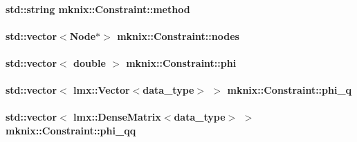\hypertarget{classmknix_1_1_constraint_ab05c0dcc5cc535f4e3bed2fd34ed6d75}{
\paragraph[{method}]{\setlength{\rightskip}{0pt plus 5cm}std\-::string mknix\-::\-Constraint\-::method\hspace{0.3cm}{\ttfamily [protected]}}}\label{classmknix_1_1_constraint_ab05c0dcc5cc535f4e3bed2fd34ed6d75}
\hypertarget{classmknix_1_1_constraint_aa4aa16e121963acf4c086f63137d4ac1}{
\paragraph[{nodes}]{\setlength{\rightskip}{0pt plus 5cm}std\-::vector$<${\bf Node}$\ast$$>$ mknix\-::\-Constraint\-::nodes\hspace{0.3cm}{\ttfamily [protected]}}}\label{classmknix_1_1_constraint_aa4aa16e121963acf4c086f63137d4ac1}
\hypertarget{classmknix_1_1_constraint_a10e027fc12cb248a49a1ded049f0a161}{
\paragraph[{phi}]{\setlength{\rightskip}{0pt plus 5cm}std\-::vector$<$ double $>$ mknix\-::\-Constraint\-::phi\hspace{0.3cm}{\ttfamily [protected]}}}\label{classmknix_1_1_constraint_a10e027fc12cb248a49a1ded049f0a161}
\hypertarget{classmknix_1_1_constraint_a667ecb78177b06981c30e23cb194b806}{
\paragraph[{phi\-\_\-q}]{\setlength{\rightskip}{0pt plus 5cm}std\-::vector$<$ lmx\-::\-Vector$<${\bf data\-\_\-type}$>$ $>$ mknix\-::\-Constraint\-::phi\-\_\-q\hspace{0.3cm}{\ttfamily [protected]}}}\label{classmknix_1_1_constraint_a667ecb78177b06981c30e23cb194b806}
\hypertarget{classmknix_1_1_constraint_a9173b52da189652951ce51b1d69fcde4}{
\paragraph[{phi\-\_\-qq}]{\setlength{\rightskip}{0pt plus 5cm}std\-::vector$<$ lmx\-::\-Dense\-Matrix$<${\bf data\-\_\-type}$>$ $>$ mknix\-::\-Constraint\-::phi\-\_\-qq\hspace{0.3cm}{\ttfamily [protected]}}}\label{classmknix_1_1_constraint_a9173b52da189652951ce51b1d69fcde4}
